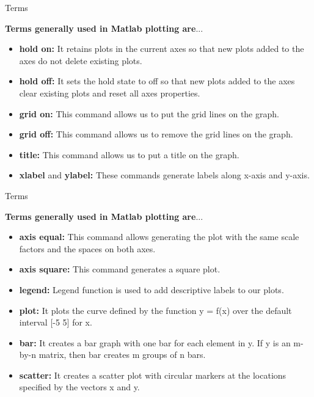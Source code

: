 \documentclass[10pt,xcolor={dvipsnames}]{beamer}
\begin{document}
    
\begin{frame}{Terms}

\textbf {Terms generally used in Matlab plotting are}...\\
    \begin{itemize}
    
    \item {\textbf {hold on:}} It retains plots in the current axes so that new plots added to the axes do not delete existing plots. 
    
    \item {\textbf {hold off:}} It sets the hold state to off so that new plots added to the axes clear existing plots and reset all axes properties. 
    
    \item {\textbf {grid on:}} This command allows us to put the grid lines on the graph.
    
    \item {\textbf {grid off:}} This command allows us to remove the grid lines on the graph.
    
    \item {\textbf {title:}} This command allows us to put a title on the graph.
    
    \item {\textbf {xlabel}} and {\textbf {ylabel:}} These commands generate labels along x-axis and y-axis.
    
    
  \end{itemize}
  \end{frame}
  
 \begin{frame}{Terms}

\textbf {Terms generally used in Matlab plotting are}...\\
    \begin{itemize}
    
    \item {\textbf {axis equal:}} This command allows generating the plot with the same scale factors and the spaces on both axes.
    
    \item {\textbf {axis square:}} This command generates a square plot.
    \item {\textbf {legend:}} Legend function is used to add descriptive labels to our plots.
    
    \item {\textbf{plot:}} It plots the curve defined by the function y = f(x) over the default interval [-5 5] for x.
    \item {\textbf{bar:}} It creates a bar graph with one bar for each element in y. If y is an m-by-n matrix, then bar creates m groups of n bars.
    
    \item {\textbf{scatter:}} It creates a scatter plot with circular markers at the locations specified by the vectors x and y.

  \end{itemize}
    
\end{frame}
\end{document}
